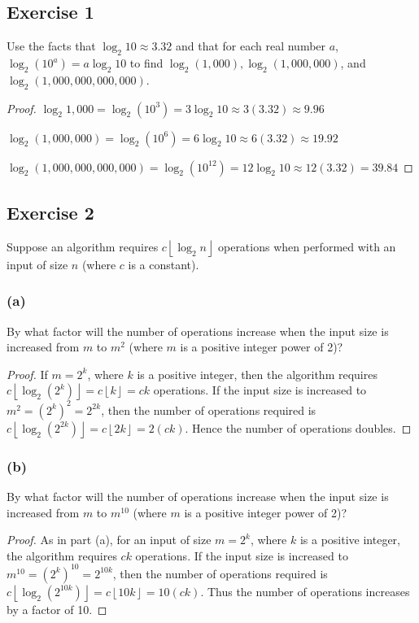 \documentclass[14pt]{extarticle}
\newcommand{\floor}[1]{{\left\lfloor#1\right\rfloor}}
\begin{document}
\subsection{Exercise 1}
Use the facts that \(\log_2 10 \approx 3.32\) and that for each real number \(a\), \(\log_2(10^a) = a \log_2 10\) to find
\(\log_2(1,000), \log_2(1,000,000)\), and \(\log_2(1,000,000,000,000)\).

\begin{proof}
    \(\log_2 1,000 = \log_2(10^3) = 3 \log_2 10 \approx 3(3.32) \approx 9.96\)

    \(\log_2(1,000,000) = \log_2(10^6) = 6 \log_2 10 \approx 6(3.32) \approx 19.92\)

    \(\log_2(1,000,000,000,000) = \log_2(10^{12}) = 12 \log_2 10 \approx 12(3.32) = 39.84\)
\end{proof}

\subsection{Exercise 2}
Suppose an algorithm requires \(c \floor{\log_2 n}\) operations when performed with an input of size \(n\) (where
\(c\) is a constant).

\subsubsection{(a)}
By what factor will the number of operations increase when the input size is increased from \(m\) to \(m^2\) (where \(m\) is
a positive integer power of 2)?

\begin{proof}
    If \(m = 2^k\), where \(k\) is a positive integer, then the algorithm requires \(c \floor{\log_2(2^k)} = c\floor{k} = ck\)
    operations. If the input size is increased to \(m^2 = (2^k)^2 = 2^{2k}\), then the number of operations required is
    \(c \floor{\log_2(2^{2k})} = c \floor{2k} = 2(ck)\). Hence the
    number of operations doubles.
\end{proof}

\subsubsection{(b)}
By what factor will the number of operations increase when the input size is increased from \(m\) to \(m^{10}\) (where \(m\)
is a positive integer power of 2)?

\begin{proof}
    As in part (a), for an input of size \(m = 2^k\), where \(k\) is a positive integer, the algorithm requires \(ck\)
    operations. If the input size is increased to \(m^{10} = (2^k)^{10} = 2^{10k}\), then the number of operations required
    is \(c \floor{\log_2(2^{10k})} = c \floor{10k} = 10(ck)\). Thus the number of operations increases by a factor of 10.
\end{proof}
\end{document}
